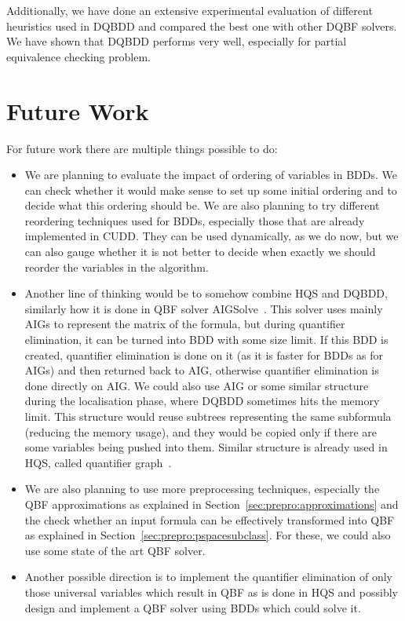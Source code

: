 \documentclass[
  digital, %
  color,
  twoside, %
  table,   %
  nolof,     %
  nolot,     %
]{fithesis3}
\theoremstyle{definition}
\theoremstyle{remark}
\begin{document}
Additionally, we have done an extensive experimental evaluation of different heuristics used in DQBDD and compared the best one with other DQBF solvers. We have shown that DQBDD performs very well, especially for partial equivalence checking problem.

\section{Future Work}

For future work there are multiple things possible to do:
\begin{itemize}
  \item We are planning to evaluate the impact of ordering of variables in BDDs. We can check whether it would make sense to set up some initial ordering and to decide what this ordering should be. We are also planning to try different reordering techniques used for BDDs, especially those that are already implemented in CUDD. They can be used dynamically, as we do now, but we can also gauge whether it is not better to decide when exactly we should reorder the variables in the algorithm.
  \item Another line of thinking would be to somehow combine HQS and DQBDD, similarly how it is done in QBF solver AIGSol\-ve~\cite{AIGSolve}. This solver uses mainly AIGs to represent the matrix of the formula, but during quantifier elimination, it can be turned into BDD with some size limit. If this BDD is created, quantifier elimination is done on it (as it is faster for BDDs as for AIGs) and then returned back to AIG, otherwise quantifier elimination is done directly on AIG. We could also use AIG or some similar structure during the localisation phase, where DQBDD sometimes hits the memory limit. This structure would reuse subtrees representing the same subformula (reducing the memory usage), and they would be copied only if there are some variables being pushed into them. Similar structure is already used in HQS, called quantifier graph~\cite{HQSquantifierLocalisation}.
  \item We are also planning to use more preprocessing techniques, especially the QBF approximations as explained in Section~\ref{sec:prepro:approximations} and the check whether an input formula can be effectively transformed into QBF as explained in Section~\ref{sec:prepro:pspacesubclass}. For these, we could also use some state of the art QBF solver.
  \item Another possible direction is to implement the quantifier elimination of only those universal variables which result in QBF as is done in HQS and possibly design and implement a QBF solver using BDDs which could solve it.
\end{itemize}
\end{document}
